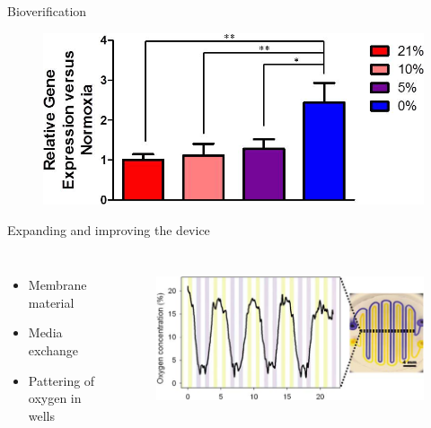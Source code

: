 \documentclass{beamer}
\begin{document}
\begin{frame}{Bioverification}
\begin{figure}
\includegraphics[width=0.8\linewidth]{images/hypoxia-pcr.png}\\
\hspace*{11pt}\hbox{\scriptsize {}}
 \end{figure}
\end{frame}

\begin{frame}{Expanding and improving the device}
\begin{columns}
\begin{itemize}
\item Membrane material
\item Media exchange
\item Pattering of oxygen in wells 
 \end{itemize}
\begin{figure}
\includegraphics[width=.8\linewidth]{images/oppegard3.png}\\
\hspace*{11pt}\hbox{\scriptsize {}}

 \end{figure}
\end{columns}
\end{frame}
\end{document}
